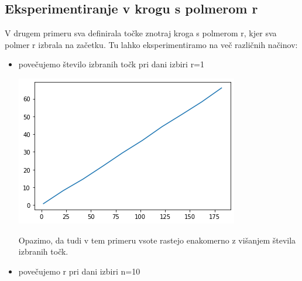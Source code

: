 \documentclass[12pt, a4paper]{article}
\begin{document}
\subsection{Eksperimentiranje v krogu s polmerom r}
V drugem primeru sva definirala točke znotraj kroga s polmerom r, kjer sva polmer r izbrala na začetku. Tu lahko eksperimentiramo na več različnih načinov:
\begin{itemize}
	\item povečujemo število izbranih točk pri dani izbiri r=1
\begin{center}
\includegraphics{krog_s_danim_polmerom.png}
\end{center}
Opazimo, da tudi v tem primeru vsote rastejo enakomerno z višanjem števila izbranih točk.

	\item povečujemo r pri dani izbiri n=10

	
\end{itemize}

\newpage
\end{document}
